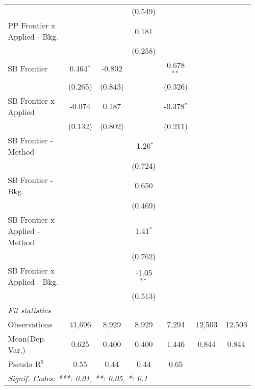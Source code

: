 \begin{tabular}{lcccccc}
                                  &               &              & (0.549)      &               &        &   \\   
   PP Frontier x Applied - Bkg.   &               &              & 0.181        &               &        &   \\   
                                  &               &              & (0.258)      &               &        &   \\   
   SB Frontier                    & 0.464$^{*}$   & -0.802       &              & 0.678$^{**}$  &        &   \\   
                                  & (0.265)       & (0.843)      &              & (0.326)       &        &   \\   
   SB Frontier x Applied          & -0.074        & 0.187        &              & -0.378$^{*}$  &        &   \\   
                                  & (0.132)       & (0.802)      &              & (0.211)       &        &   \\   
   SB Frontier - Method           &               &              & -1.20$^{*}$  &               &        &   \\   
                                  &               &              & (0.724)      &               &        &   \\   
   SB Frontier - Bkg.             &               &              & 0.650        &               &        &   \\   
                                  &               &              & (0.469)      &               &        &   \\   
   SB Frontier x Applied - Method &               &              & 1.41$^{*}$   &               &        &   \\   
                                  &               &              & (0.762)      &               &        &   \\   
   SB Frontier x Applied - Bkg.   &               &              & -1.05$^{**}$ &               &        &   \\   
                                  &               &              & (0.513)      &               &        &   \\   
   \midrule
   \emph{Fit statistics}\\
   Observations                   & 41,696        & 8,929        & 8,929        & 7,294         & 12,503 & 12,503\\  
Mean(Dep. Var.) & 0.625 & 0.400 & 0.400 & 1.446 & 0.844 & 0.844 \\
   Pseudo R$^2$                   & 0.55          & 0.44         & 0.44         & 0.65          &        & \\  
   \midrule \midrule
   \multicolumn{7}{l}{\emph{Signif. Codes: ***: 0.01, **: 0.05, *: 0.1}}\\
\end{tabular}
\par\endgroup
